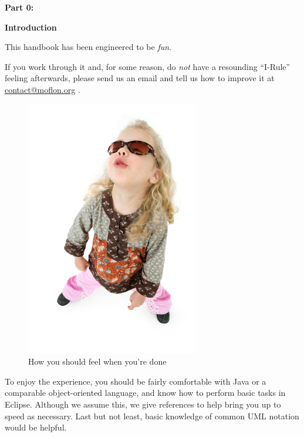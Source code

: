 \genHeader

{\bf \huge Part 0:}

\vspace{0.8cm}

{\bf \Huge Introduction }

\vspace{2cm}


This handbook has been engineered to be \emph{fun}.

If you work through it and, for some reason, do \emph{not} have a resounding \mbox{``I-Rule''} feeling afterwards, please send us an email and tell us how to
improve it at \href{mailto:contact@moflon.org}{contact@moflon.org} .


\begin{figure}[htp]
\begin{center}
	\includegraphics[height=0.45\textheight]{../introduction_images/i-rule}
	\caption{How you should feel when you're done}
	\label{i-rule}
\end{center}
\end{figure}
\break
 

To enjoy the experience, you should be fairly comfortable with Java or a comparable object-oriented language, and know how to perform basic tasks in Eclipse. 
Although we assume this, we give references to help bring you up to speed as necessary. Last but not least, basic knowledge of common UML notation would be
helpful.

